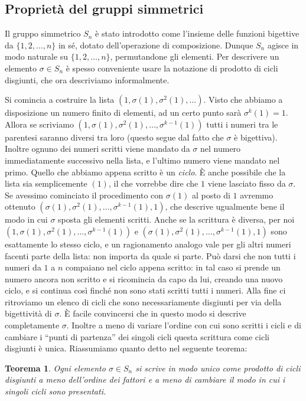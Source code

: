 \documentclass[11pt]{article}
\theoremstyle{plain}
\newtheorem{thm}{Teorema}[section]
\theoremstyle{definition}
\theoremstyle{remark}
\begin{document}
\subsection{Proprietà del gruppi simmetrici}
Il gruppo simmetrico $S_n$ è stato introdotto come l'insieme delle funzioni bigettive da $\{1,2,\dots,n\}$ in sé, dotato dell'operazione di composizione.
Dunque $S_n$ agisce in modo naturale su $\{1,2,\dots,n\}$, permutandone gli elementi. Per descrivere un elemento $\sigma \in S_n$ 
è spesso conveniente usare la notazione di prodotto di cicli disgiunti, che ora descriviamo informalmente.

Si comincia a costruire la lista $(1, \sigma(1), \sigma^2(1), \dots)$. Visto che abbiamo a disposizione un numero finito di elementi,
ad un certo punto sarà $\sigma^k(1) = 1$. Allora se scriviamo $(1, \sigma(1), \sigma^2(1), \dots, \sigma^{k-1}(1))$ tutti i numeri tra le 
parentesi saranno diversi tra loro (questo segue dal fatto che $\sigma$ è bigettiva). Inoltre ognuno dei numeri scritti viene mandato da $\sigma$
nel numero immediatamente successivo nella lista, e l'ultimo numero viene mandato nel primo. Quello che abbiamo appena scritto è un \emph{ciclo}.
\`E anche possibile che la lista sia semplicemente $(1)$, il che vorrebbe dire che $1$ viene lasciato fisso da $\sigma$.
Se avessimo cominciato il procedimento con $\sigma(1)$ al posto di $1$ avremmo ottenuto $(\sigma(1), \sigma^2(1), \dots, \sigma^{k-1}(1), 1)$, che
descrive ugualmente bene il modo in cui $\sigma$ sposta gli elementi scritti. Anche se la scrittura è diversa, per noi
$(1, \sigma(1), \sigma^2(1), \dots, \sigma^{k-1}(1))$ e $(\sigma(1), \sigma^2(1), \dots, \sigma^{k-1}(1), 1)$ sono esattamente lo stesso ciclo,
e un ragionamento analogo vale per gli altri numeri facenti parte della lista: non importa da quale si parte.
Può darsi che non tutti i numeri da $1$ a $n$ compaiano nel ciclo appena scritto: in tal caso si prende un numero ancora non scritto e si ricomincia da capo
da lui, creando una nuovo ciclo, e si continua così finché non sono stati scritti tutti i numeri.
Alla fine ci ritroviamo un elenco di cicli che sono necessariamente disgiunti per via della bigettività di $\sigma$.
\`E facile convincersi che in questo modo si descrive completamente $\sigma$. Inoltre a meno di variare
l'ordine con cui sono scritti i cicli e di cambiare i ``punti di partenza'' dei singoli cicli questa scrittura come cicli disgiunti è unica.
Riassumiamo quanto detto nel seguente teorema:

\begin{thm}
Ogni elemento $\sigma \in S_n$ si scrive in modo unico come prodotto di cicli disgiunti a meno dell'ordine dei fattori e a meno di 
cambiare il modo in cui i singoli cicli sono presentati.
\end{thm}
\end{document}
